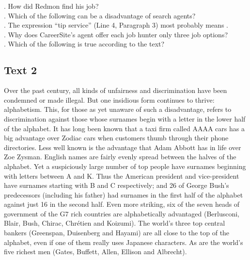 \begin{questions}  .	How did Redmon find his job?\\
 .	Which of the following can be a disadvantage of search agents?\\
 .	The expression “tip service” (Line 4, Paragraph 3) most probably means \ltk{}.\\
 .	Why does CareerSite’s agent offer each job hunter only three job options?\\
.	Which of the following is true according to the text?\\
\end{questions}    \subsection{Text 2}
Over the past century, all kinds of unfairness and discrimination have been condemned or made illegal. But one insidious form continues to thrive: alphabetism. This, for those as yet unaware of such a disadvantage, refers to discrimination against those whose surnames begin with a letter in the lower half of the alphabet.
It has long been known that a taxi firm called AAAA cars has a big advantage over Zodiac cars when customers thumb through their phone directories. Less well known is the advantage that Adam Abbott has in life over Zoe Zysman. English names are fairly evenly spread between the halves of the alphabet. Yet a suspiciously large number of top people have surnames beginning with letters between A and K.
Thus the American president and vice-president have surnames starting with B and C respectively; and 26 of George Bush’s predecessors (including his father) had surnames in the first half of the alphabet against just 16 in the second half. Even more striking, six of the seven heads of government of the G7 rich countries are alphabetically advantaged (Berlusconi, Blair, Bush, Chirac, Chrétien and Koizumi). The world’s three top central bankers (Greenspan, Duisenberg and Hayami) are all close to the top of the alphabet, even if one of them really uses Japanese characters. As are the world’s five richest men (Gates, Buffett, Allen, Ellison and Albrecht).
